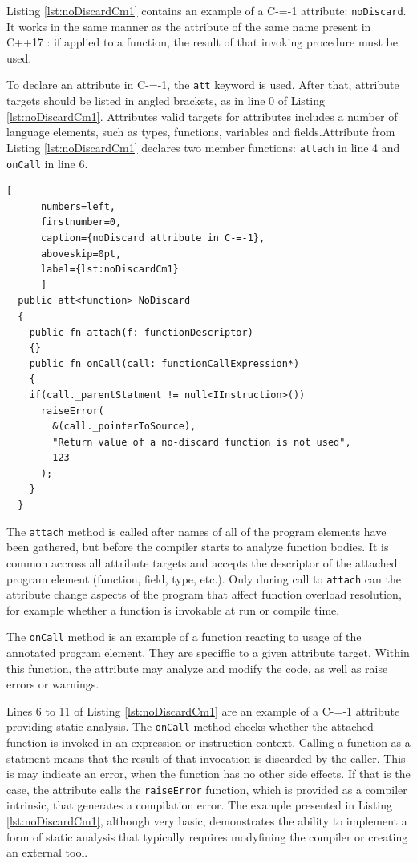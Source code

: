 Listing \ref{lst:noDiscardCm1} contains an example of a C-=-1 attribute: \lstinline{noDiscard}.
It works in the same manner as the attribute of the same name present in C++17 \cite{ISO:cpp17}: if applied to a function, the result of that invoking procedure must be used.

To declare an attribute in C-=-1, the \lstinline{att} keyword is used.
After that, attribute targets should be listed in angled brackets, as in line 0 of Listing \ref{lst:noDiscardCm1}.
Attributes valid targets for attributes includes a number of language elements, such as types, functions, variables and fields.Attribute from Listing \ref{lst:noDiscardCm1} declares two member functions: \lstinline{attach} in line 4 and \lstinline{onCall} in line 6.

\begin{minipage}{\linewidth}

	\begin{lstlisting}[
	  numbers=left,
	  firstnumber=0,
	  caption={noDiscard attribute in C-=-1},
	  aboveskip=0pt,
	  label={lst:noDiscardCm1}
	  ]
  public att<function> NoDiscard
  {
	public fn attach(f: functionDescriptor)
	{}
	public fn onCall(call: functionCallExpression*)
	{
	if(call._parentStatment != null<IInstruction>())
	  raiseError(
		&(call._pointerToSource),
		"Return value of a no-discard function is not used",
		123
	  );
	}
  }
  \end{lstlisting}
\end{minipage}

The \lstinline{attach} method is called after names of all of the program elements have been gathered, but before the compiler starts to analyze function bodies.
It is common accross all attribute targets and accepts the descriptor of the attached program element (function, field, type, etc.).
Only during call to \lstinline{attach} can the attribute change aspects of the program that affect function overload resolution, for example
whether a function is invokable at run or compile time.

The \lstinline{onCall} method is an example of a function reacting to usage of the annotated program element.
They are speciffic to a given attribute target.
Within this function, the attribute may analyze and modify the code, as well as raise errors or warnings.

Lines 6 to 11 of Listing \ref{lst:noDiscardCm1} are an example of a C-=-1 attribute providing static analysis.
The \lstinline{onCall} method checks whether the attached function is invoked in an expression or instruction context.
Calling a function as a statment means that the result of that invocation is discarded by the caller.
This is may indicate an error, when the function has no other side effects.
If that is the case, the attribute calls the \lstinline{raiseError} function, which is provided as a compiler intrinsic, that generates a compilation error.
The example presented in Listing \ref{lst:noDiscardCm1}, although very basic, demonstrates the ability to implement a form of static analysis that typically requires modyfining the compiler or creating an external tool.

